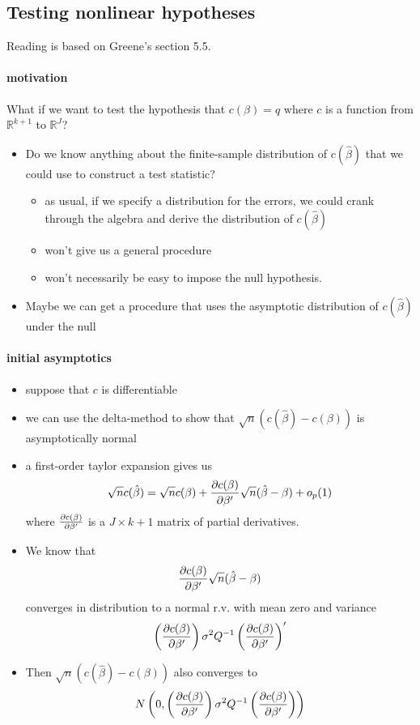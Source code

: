 \subsection{Testing nonlinear hypotheses}
\label{sec-3-2}

     Reading is based on Greene's section 5.5.
\paragraph{motivation}
\label{sec-3-2-1}

      What if we want to test the hypothesis that $c(\beta) = q$ where
      $c$ is a function from $\mathbb{R}^{k+1}$ to $\mathbb{R}^J$?
\begin{itemize}
\item Do we know anything about the finite-sample distribution of
        $c(\hat\beta)$ that we could use to construct a test statistic?
\begin{itemize}
\item as usual, if we specify a distribution for the errors, we
          could crank through the algebra and derive the distribution of
          $c(\hat\beta)$
\item won't give us a general procedure
\item won't necessarily be easy to impose the null hypothesis.
\end{itemize}
\item Maybe we can get a procedure that uses the asymptotic
        distribution of $c(\hat\beta)$ under the null
\end{itemize}
\paragraph{initial asymptotics}
\label{sec-3-2-2}

\begin{itemize}
\item suppose that $c$ is differentiable
\item we can use the delta-method to show that
        $\sqrt{n}(c(\hat\beta) - c(\beta))$ is asymptotically normal
\item a first-order taylor expansion gives us
        \[ \sqrt{n} c(\hat\beta) = \sqrt{n} c(\beta) +
        {\partial c(\beta) \over \partial \beta'} \sqrt{n} (\hat\beta -
        \beta) + o_p(1) \]
        where $\partial c(\beta) \over \partial \beta'$ is a $J \times
        k+1$ matrix of partial derivatives.
\item We know that \[{\partial c(\beta) \over \partial \beta'}
        \sqrt{n} (\hat\beta - \beta)\] converges in distribution to a
        normal r.v. with mean zero and variance \[ \left({\partial
        c(\beta) \over \partial \beta'}\right) \sigma^2 Q^{-1}
        \left({\partial c(\beta) \over \partial \beta'}\right)'\]
\item Then $\sqrt{n} (c(\hat\beta) - c(\beta))$ also converges to \[
        N\left(0, \left({\partial
        c(\beta) \over \partial \beta'}\right) \sigma^2 Q^{-1}
        \left({\partial c(\beta) \over \partial \beta'}\right) \right)\]
\end{itemize}
